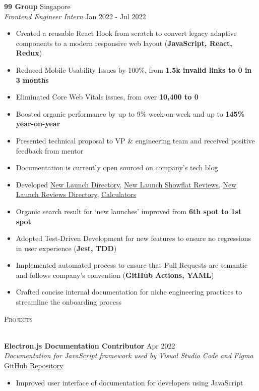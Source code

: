 \documentclass[a4paper]{article}
\newcommand{\lineunder} {
    \vspace*{-8pt} \\
    \hspace*{-12pt} \hrulefill \\
}
\newcommand{\header} [1] {
    {\hspace*{-12pt}\vspace*{6pt} \large\textsc{#1}}
    \vspace*{-6pt} \lineunder
}
\begin{document}
\textbf{99 Group} \hfill Singapore\\
\textit{Frontend Engineer Intern} \hfill Jan 2022 - Jul 2022\\
\vspace{-2mm}
\begin{itemize} \itemsep 1pt
	\item Created a reusable React Hook from scratch to convert legacy adaptive components to a modern responsive web layout (\textbf{JavaScript, React, Redux})
	\item Reduced Mobile Usability Issues by 100\%, from \textbf{1.5k invalid links to 0 in 3 months}
	\item Eliminated Core Web Vitals issues, from over \textbf{10,400 to 0}
	\item Boosted organic performance by up to 9\% week-on-week and up to \textbf{145\% year-on-year}
	\item Presented technical proposal to VP \& engineering team and received positive feedback from mentor
	\item Documentation is currently open sourced on \href{https://medium.com/99dotco/adaptive-to-responsive-in-1-react-hook-4d1ce93e1488}{company’s tech blog}
	\item Developed \href{https://www.99.co/singapore/new-launches}{New Launch Directory}, \href{https://www.99.co/singapore/condos-apartments/reviews/liv-mb}{New Launch Showflat Reviews}, \href{https://www.99.co/singapore/condos-apartments/reviews}{New Launch Reviews Directory}, \href{https://www.99.co/singapore/tools/tdsr-calculator}{Calculators}
	\item Organic search result for ‘new launches’ improved from \textbf{6th spot to 1st spot}
	\item Adopted Test-Driven Development for new features to ensure no regressions in user experience (\textbf{Jest, TDD})
	\item Implemented automated process to ensure that Pull Requests are semantic and follows company’s convention (\textbf{GitHub Actions, YAML})
    \item Crafted concise internal documentation for niche engineering practices to streamline the onboarding process
\end{itemize}

\header{Projects}
\vspace{1mm}

\textbf{Electron.js Documentation Contributor} \hfill Apr 2022\\
\textit{Documentation for JavaScript framework used by Visual Studio Code and Figma} \hfill \href{https://github.com/electron/electronjs.org-new/pull/211}{GitHub Repository}\\
\vspace{-2mm}
\begin{itemize} \itemsep 1pt
    \item Improved user interface of documentation for developers using JavaScript
\end{itemize}
\end{document}
